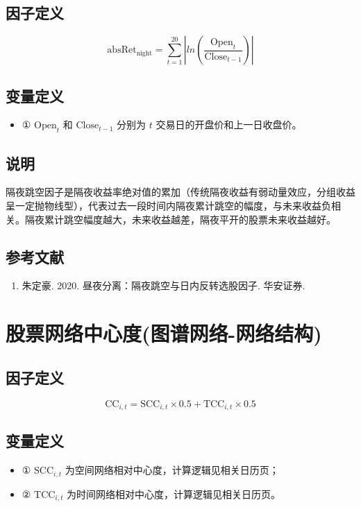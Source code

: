 \documentclass{article}
\begin{document}
\subsection{因子定义}

\begin{equation}
    \mathrm{absRet}_{\mathrm{night}} = \sum_{t=1}^{20} \left| ln (\frac{\mathrm{Open}_t}{\mathrm{Close}_{t-1}}  )\right|
\end{equation}

\subsection{变量定义}
\begin{itemize}
    \item ① \( \mathrm{Open}_t \) 和 \( \mathrm{Close}_{t-1} \) 分别为 \( t \) 交易日的开盘价和上一日收盘价。
\end{itemize}

\subsection{说明}
隔夜跳空因子是隔夜收益率绝对值的累加（传统隔夜收益有弱动量效应，分组收益呈一定抛物线型），代表过去一段时间内隔夜累计跳空的幅度，与未来收益负相关。隔夜累计跳空幅度越大，未来收益越差，隔夜平开的股票未来收益越好。

\subsection{参考文献}
\begin{enumerate}
    \item 朱定豪. 2020. 昼夜分离：隔夜跳空与日内反转选股因子. 华安证券.
\end{enumerate}

\section{股票网络中心度(图谱网络-网络结构)}

\subsection{因子定义}
\begin{equation}
    \mathrm{CC}_{i,t} = \mathrm{SCC}_{i,t} \times 0.5 + \mathrm{TCC}_{i,t} \times 0.5
\end{equation}

\subsection{变量定义}
\begin{itemize}
    \item ① \( \mathrm{SCC}_{i,t} \) 为空间网络相对中心度，计算逻辑见相关日历页；
    \item ② \( \mathrm{TCC}_{i,t} \) 为时间网络相对中心度，计算逻辑见相关日历页。
\end{itemize}
\end{document}
